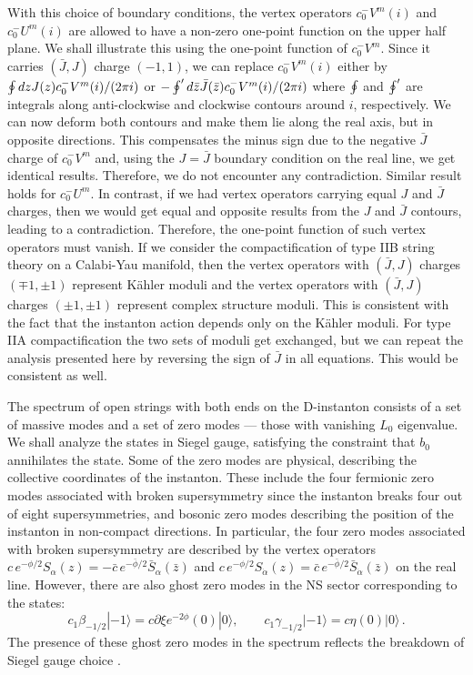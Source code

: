 \documentclass[12pt,a4paper]{article}
\newcommand{\be}{\begin{equation}}
\newcommand{\ee}{\end{equation}}
\newcommand{\p}{\partial}
\newcommand{\I}{\mathrm{i}}
\def\bz{\bar z}
\newcommand{\dalpha}{\beta}
\def\dalpha{{\dot\alpha}}
\def\I{i}
\begin{document}
With this choice of boundary conditions, the vertex operators $c_0^-V^{m}(i)$ and $c_0^-U^{m}(i)$
are allowed to have a non-zero one-point function
on the upper half plane.  We shall illustrate this using the one-point function
of $c_0^-V^{m}$. Since it carries
$(\bar J, J)$ charge $(-1,1)$, we can replace $c_0^-V^{m}(i)$ either by $\ointop dz J(z)
c_0^-V^{m}(i)/(2\pi \I)$ or $-\ointop' d\bar z \bar J(\bar z) c_0^-V^{m}(i)/(2\pi \I)$
where $\ointop$ and $\ointop'$ are integrals along
anti-clockwise and clockwise contours around $i$, respectively. We can now deform both
contours and make them lie along the real axis, but in opposite directions. This compensates the
minus sign due to the negative $\bar J$ charge of $c_0^-V^{m}$ and, using the $J=\bar J$ boundary
condition on the real line, we get identical results. Therefore, we do not encounter any
contradiction. Similar result holds for $c_0^-U^{m}$. In contrast, if we had vertex operators
carrying equal $J$ and $\bar J$ charges, then we would get equal and opposite results from
the $J$ and $\bar J$ contours, leading to a contradiction. Therefore, the one-point function of
such vertex operators must vanish. If we consider the compactification of type IIB string theory
on a Calabi-Yau manifold, then the vertex operators with $(\bar J, J)$ charges
$(\mp 1,\pm 1)$ represent K\"ahler moduli and the vertex operators with $(\bar J, J)$ charges
$(\pm 1,\pm 1)$ represent complex structure moduli. This is consistent with the fact that the
instanton action depends only on the K\"ahler moduli.
For type IIA compactification the two sets of moduli get exchanged,
but we can repeat the analysis presented here by reversing the sign of $\bar J$ in all equations. This would be consistent as well.

The spectrum of open strings with both ends on the D-instanton
consists of a set of massive modes and a set of zero modes --- those with vanishing $L_0$ eigenvalue.
We shall analyze the states in Siegel gauge, satisfying the constraint that $b_0$ annihilates the state.
Some of the zero modes are physical, describing the collective coordinates of the instanton. These
include the four fermionic zero modes associated with broken supersymmetry since the
instanton breaks four out of eight supersymmetries, and bosonic zero modes describing the
position of the instanton in non-compact directions.
In particular, the four zero modes associated with broken supersymmetry are described
by the vertex operators $c \, e^{-\phi/2} S_\alpha(z) = -\bar c \, e^{-\bar\phi/2} \bar S_\alpha(\bz)$ and
$c \, e^{-\phi/2} S_\dalpha(z) = \bar c \, e^{-\bar\phi/2} \bar S_\dalpha(\bz)$
on the real line.
However, there are also ghost zero modes in the NS sector corresponding to the states:
\be\label{eghost}
c_1 \beta_{-1/2} |-1\rangle=c\p\xi e^{-2\phi}(0)|0\rangle, \qquad c_1 \gamma_{-1/2} |-1\rangle
= c\eta(0)|0\rangle\, .
\ee
The presence of these ghost zero modes in the spectrum reflects
the breakdown of Siegel gauge choice \cite{Sen:2021qdk}.
\end{document}
